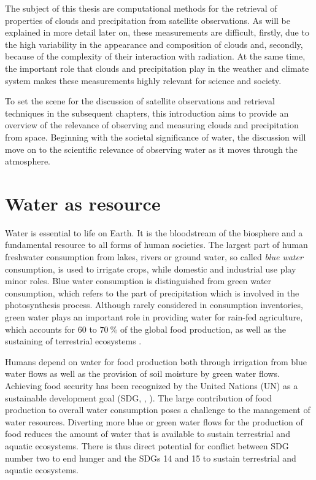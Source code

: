 The subject of this thesis are computational methods for the retrieval of
properties of clouds and precipitation from satellite observations. As will be
explained in more detail later on, these measurements are difficult, firstly,
due to the high variability in the appearance and composition of clouds and,
secondly, because of the complexity of their interaction with radiation. At the
same time, the important role that clouds and precipitation play in the weather
and climate system makes these measurements highly relevant for science and
society.

To set the scene for the discussion of satellite observations and retrieval
techniques in the subsequent chapters, this introduction aims to provide an
overview of the relevance of observing and measuring clouds and precipitation
from space. Beginning with the societal significance of water, the discussion
will move on to the scientific relevance of observing water as it moves through
the atmosphere.

\section{Water as resource}

Water is essential to life on Earth. It is the bloodstream of the biosphere
\citep{falkenmark04} and a fundamental resource to all forms of human
societies. The largest part of human freshwater consumption from lakes, rivers
or ground water, so called \textit{blue water} consumption, is used to irrigate
crops, while domestic and industrial use play minor roles. Blue water
consumption is distinguished from green water consumption, which refers to the
part of precipitation which is involved in the photosynthesis process. Although
rarely considered in consumption inventories, green water plays an important
role in providing water for rain-fed agriculture, which accounts for $60$ to
$\SI{70}{\percent}$ of the global food production, as well as the sustaining
of terrestrial ecosystems \citep{falkenmark04}.

Humans depend on water for food production both through irrigation from
blue water flows as well as the provision of soil moisture by green water flows.
Achieving food security has been recognized by the United Nations (UN) as a
sustainable development goal (SDG, \citeauthor{sdg}, \citeyear{sdg}). The large
contribution of food production to overall water consumption poses a challenge
to the management of water resources. Diverting more blue or green water flows
for the production of food reduces the amount of water that is available to
sustain terrestrial and aquatic ecosystems. There is thus direct potential for
conflict between SDG number two to end hunger and the SDGs 14 and 15 to sustain
terrestrial and aquatic ecosystems.

